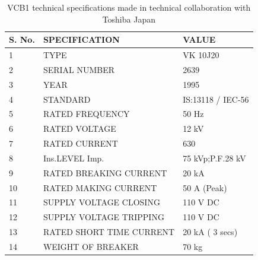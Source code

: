 \documentclass{report}
\begin{document}
	\begin{table}[]
		\centering
		\begin{tabular}{@{}lll@{}}
			\toprule
			\textbf{S. No.} & \textbf{SPECIFICATION}   & \textbf{VALUE}    \\ \midrule
			1               & TYPE                     & VK 10J20          \\
			2               & SERIAL NUMBER            & 2639              \\
			3               & YEAR                     & 1995              \\
			4               & STANDARD                 & IS:13118 / IEC-56 \\
			5               & RATED FREQUENCY          & 50 Hz             \\
			6               & RATED VOLTAGE            & 12 kV             \\
			7               & RATED CURRENT            & 630               \\
			8               & Ins.LEVEL Imp.           & 75 kVp;P.F.28 kV  \\
			9               & RATED BREAKING CURRENT   & 20 kA             \\
			10              & RATED MAKING CURRENT     & 50 A (Peak)       \\
			11              & SUPPLY VOLTAGE CLOSING   & 110 V DC          \\
			12              & SUPPLY VOLTAGE TRIPPING  & 110 V DC          \\
			13              & RATED SHORT TIME CURRENT & 20 kA ( 3 secs)   \\
			14              & WEIGHT OF BREAKER        & 70 kg             \\ \bottomrule
		\end{tabular}
		\caption{VCB1 technical specifications made in technical collaboration with Toshiba Japan}
		\label{vcb1_nameplate}
	\end{table}
\end{document}
